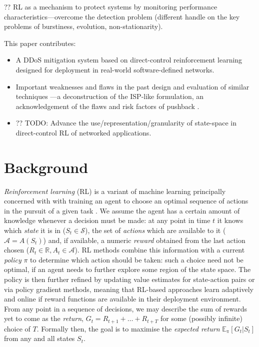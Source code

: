 \documentclass[conference, letterpaper, 10pt, times]{IEEEtran}
\begin{document}
?? RL as a mechanism to protect systems by monitoring performance characteristics---overcome the detection problem (different handle on the key problems of burstiness, evolution, non-stationarity).

This paper contributes:
\begin{itemize}
	\item A DDoS mitigation system based on direct-control reinforcement learning designed for deployment in real-world software-defined networks.
	\item Important weaknesses and flaws in the past design and evaluation of similar techniques \cite{DBLP:journals/eaai/MalialisK15}---a deconstruction of the ISP-like formulation, an acknowledgement of the flaws and risk factors of pushback \cite{DBLP:journals/ccr/MahajanBFIPS02a}.
	\item ?? TODO: Advance the use/representation/granularity of state-space in direct-control RL of networked applications.
\end{itemize}

\section{Background}

\emph{Reinforcement learning} (RL) is a variant of machine learning principally concerned with with training an agent to choose an optimal sequence of actions in the pursuit of a given task \cite{RL2E}.
We assume the agent has a certain amount of knowledge whenever a decision must be made: at any point in time $t$ it knows which \emph{state} it is in ($S_t \in \mathcal{S}$), the set of \emph{actions} which are available to it ($\mathcal{A} = A(S_t)$) and, if available, a numeric \emph{reward} obtained from the last action chosen ($R_t \in \mathbb{R}, A_t \in \mathcal{A}$).
RL methods combine this information with a current \emph{policy} $\pi$ to determine which action should be taken: such a choice need not be optimal, if an agent needs to further explore some region of the state space.
The policy is then further refined by updating value estimates for state-action pairs or via policy gradient methods, meaning that RL-based approaches learn adaptively and online if reward functions are available in their deployment environment.
From any point in a sequence of decisions, we may describe the sum of rewards yet to come as the \emph{return}, $G_t = R_{t+1} + \ldots + R_{t+T}$ for some (possibly infinite) choice of $T$.
Formally then, the goal is to maximise the \emph{expected return} $\operatorname{\mathbb{E}_{\pi}}[G_t | S_t]$ from any and all states $S_t$.
\end{document}
